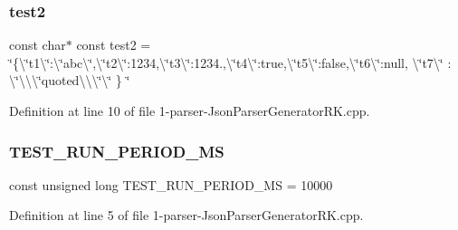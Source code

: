 \subsubsection{\texorpdfstring{test2}{test2}}
{\footnotesize\ttfamily const char$\ast$ const test2 = \char`\"{}\{\textbackslash{}\char`\"{}t1\textbackslash{}\char`\"{}\+:\textbackslash{}\char`\"{}abc\textbackslash{}\char`\"{},\textbackslash{}\char`\"{}t2\textbackslash{}\char`\"{}\+:1234,\textbackslash{}\char`\"{}t3\textbackslash{}\char`\"{}\+:1234.,\textbackslash{}\char`\"{}t4\textbackslash{}\char`\"{}\+:true,\textbackslash{}\char`\"{}t5\textbackslash{}\char`\"{}\+:false,\textbackslash{}\char`\"{}t6\textbackslash{}\char`\"{}\+:null, \textbackslash{}\char`\"{}t7\textbackslash{}\char`\"{} \+: \textbackslash{}\char`\"{}\textbackslash{}\textbackslash{}\textbackslash{}\char`\"{}quoted\textbackslash{}\textbackslash{}\textbackslash{}\char`\"{}\textbackslash{}\char`\"{} \} \char`\"{}}



Definition at line 10 of file 1-\/parser-\/\+Json\+Parser\+Generator\+R\+K.\+cpp.

\mbox{\label{1-parser-_json_parser_generator_r_k_8cpp_a0aa12824a9c1a44e8d9f2499e0ba2698}} 
\subsubsection{\texorpdfstring{T\+E\+S\+T\+\_\+\+R\+U\+N\+\_\+\+P\+E\+R\+I\+O\+D\+\_\+\+MS}{TEST\_RUN\_PERIOD\_MS}}
{\footnotesize\ttfamily const unsigned long T\+E\+S\+T\+\_\+\+R\+U\+N\+\_\+\+P\+E\+R\+I\+O\+D\+\_\+\+MS = 10000}



Definition at line 5 of file 1-\/parser-\/\+Json\+Parser\+Generator\+R\+K.\+cpp.

